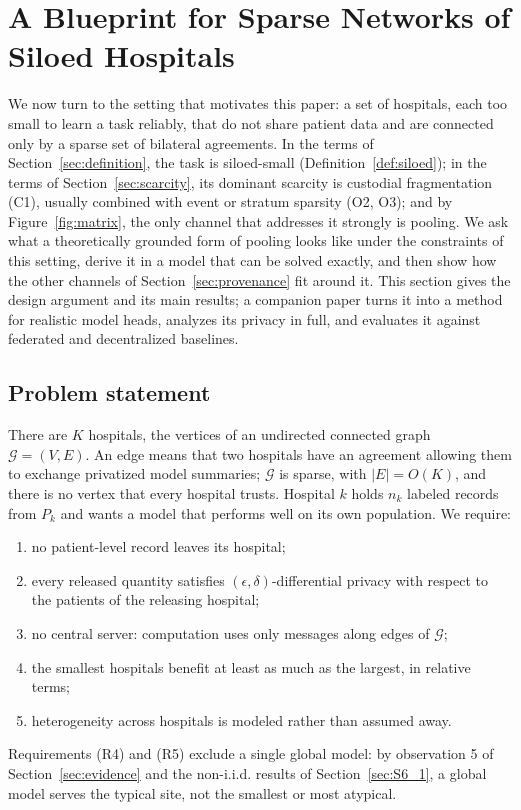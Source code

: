 \documentclass[acmsmall,screen,review]{acmart}
\theoremstyle{acmdefinition}
\begin{document}
\section{A Blueprint for Sparse Networks of Siloed Hospitals}\label{sec:blueprint}

We now turn to the setting that motivates this paper: a set of hospitals, each too small to learn a task reliably, that do not share patient data and are connected only by a sparse set of bilateral agreements. In the terms of Section~\ref{sec:definition}, the task is siloed-small (Definition~\ref{def:siloed}); in the terms of Section~\ref{sec:scarcity}, its dominant scarcity is custodial fragmentation (C1), usually combined with event or stratum sparsity (O2, O3); and by Figure~\ref{fig:matrix}, the only channel that addresses it strongly is pooling. We ask what a theoretically grounded form of pooling looks like under the constraints of this setting, derive it in a model that can be solved exactly, and then show how the other channels of Section~\ref{sec:provenance} fit around it. This section gives the design argument and its main results; a companion paper \cite{simoes2026ghb} turns it into a method for realistic model heads, analyzes its privacy in full, and evaluates it against federated and decentralized baselines.

\subsection{Problem statement}\label{sec:S8_1}

There are $K$ hospitals, the vertices of an undirected connected graph $\mathcal{G}=(V,E)$. An edge means that two hospitals have an agreement allowing them to exchange privatized model summaries; $\mathcal{G}$ is sparse, with $|E|=O(K)$, and there is no vertex that every hospital trusts. Hospital $k$ holds $n_k$ labeled records from $P_k$ and wants a model that performs well on its own population. We require:
\begin{enumerate}[label=(R\arabic*),leftmargin=*,itemsep=1pt]
\item no patient-level record leaves its hospital;
\item every released quantity satisfies $(\epsilon,\delta)$-differential privacy with respect to the patients of the releasing hospital;
\item no central server: computation uses only messages along edges of $\mathcal{G}$;
\item the smallest hospitals benefit at least as much as the largest, in relative terms;
\item heterogeneity across hospitals is modeled rather than assumed away.
\end{enumerate}
Requirements (R4) and (R5) exclude a single global model: by observation 5 of Section~\ref{sec:evidence} and the non-i.i.d. results of Section~\ref{sec:S6_1}, a global model serves the typical site, not the smallest or most atypical.
\end{document}
